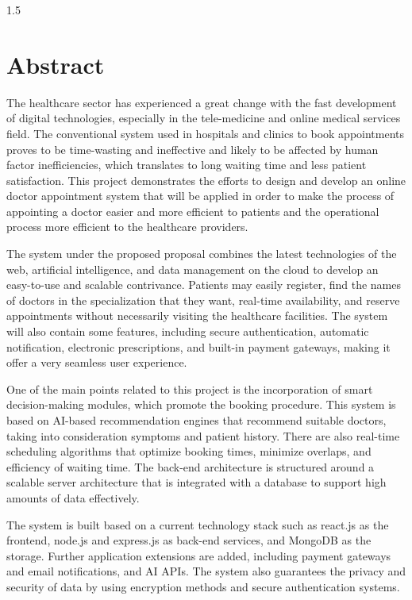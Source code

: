 \newpage
{}
\thispagestyle{empty}
\begin{spacing}{1.5}
\chapter*{Abstract}

The healthcare sector has experienced a great change with the fast development of digital technologies, especially in the tele-medicine and online medical services field. The conventional system used in hospitals and clinics to book appointments proves to be time-wasting and ineffective and likely to be affected by human factor inefficiencies, which translates to long waiting time and less patient satisfaction. This project demonstrates the efforts to design and develop an online doctor appointment system that will be applied in order to make the process of appointing a doctor easier and more efficient to patients and the operational process more efficient to the healthcare providers.

The system under the proposed proposal combines the latest technologies of the web, artificial intelligence, and data management on the cloud to develop an easy-to-use and scalable contrivance. Patients may easily register, find the names of doctors in the specialization that they want, real-time availability, and reserve appointments without necessarily visiting the healthcare facilities. The system will also contain some features, including secure authentication, automatic notification, electronic prescriptions, and built-in payment gateways, making it offer a very seamless user experience.

One of the main points related to this project is the incorporation of smart decision-making modules, which promote the booking procedure. This system is based on AI-based recommendation engines that recommend suitable doctors, taking into consideration symptoms and patient history. There are also real-time scheduling algorithms that optimize booking times, minimize overlaps, and efficiency of waiting time. The back-end architecture is structured around a scalable server architecture that is integrated with a database to support high amounts of data effectively.

The system is built based on a current technology stack such as react.js as the frontend, node.js and express.js as back-end services, and MongoDB as the storage. Further application extensions are added, including payment gateways and email notifications, and AI APIs. The system also guarantees the privacy and security of data by using encryption methods and secure authentication systems.


\end{spacing}
